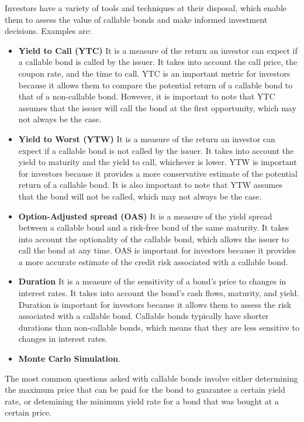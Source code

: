 \documentclass[12pt,a4paper]{book}
\begin{document}
Investors have a variety of tools and techniques at their disposal, which enable them to assess the value of callable bonds and make informed investment decisions. Examples are:
\begin{itemize}
\item \textbf{Yield to Call (YTC)} It is a measure of the return an investor can expect if a callable bond is called by the issuer. It takes into account the call price, the coupon rate, and the time to call. YTC is an important metric for investors because it allows them to compare the potential return of a callable bond to that of a non-callable bond. However, it is important to note that YTC assumes that the issuer will call the bond at the first opportunity, which may not always be the case.
\item \textbf{Yield to Worst (YTW)} It is a measure of the return an investor can expect if a callable bond is not called by the issuer. It takes into account the yield to maturity and the yield to call, whichever is lower. YTW is important for investors because it provides a more conservative estimate of the potential return of a callable bond. It is also important to note that YTW assumes that the bond will not be called, which may not always be the case.
\item \textbf{Option-Adjusted spread (OAS)} It is a measure of the yield spread between a callable bond and a risk-free bond of the same maturity. It takes into account the optionality of the callable bond, which allows the issuer to call the bond at any time. OAS is important for investors because it provides a more accurate estimate of the credit risk associated with a callable bond.
\item \textbf{Duration} It is a measure of the sensitivity of a bond's price to changes in interest rates. It takes into account the bond's cash flows, maturity, and yield. Duration is important for investors because it allows them to assess the risk associated with a callable bond. Callable bonds typically have shorter durations than non-callable bonds, which means that they are less sensitive to changes in interest rates.
\item \textbf{Monte Carlo Simulation}.
\end{itemize}

The most common questions asked with callable bonds involve either determining the maximum price that can be paid for the bond to guarantee a certain yield rate, or detemining the minimum yield rate for a bond that was bought at a certain price.
\end{document}
